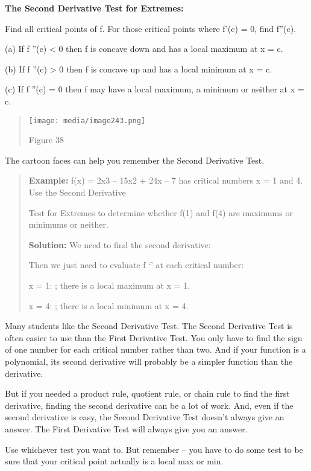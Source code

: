 \textbf{The Second Derivative Test for Extremes:}

Find all critical points of f. For those critical points where f'(c) =
0, find f''(c).

(a) If f ''(c) \textless{} 0 then f is concave down and has a local
maximum at x = c.

(b) If f ''(c) \textgreater{} 0 then f is concave up and has a local
minimum at x = c.

(c) If f ''(c) = 0 then f may have a local maximum, a minimum or neither
at x = c.

\begin{quote}
\texttt{[image: media/image243.png]}

Figure 38
\end{quote}

The cartoon faces can help you remember the Second Derivative Test.

\begin{quote}
\textbf{Example:} f(x) = 2x3 -- 15x2 + 24x -- 7 has critical numbers x =
1 and 4. Use the Second Derivative

Test for Extremes to determine whether f(1) and f(4) are maximums or
minimums or neither.

\textbf{Solution:} We need to find the second derivative:

Then we just need to evaluate f `' at each critical number:

x = 1: ; there is a local maximum at x = 1.

x = 4: ; there is a local minimum at x = 4.
\end{quote}

Many students like the Second Derivative Test. The Second Derivative
Test is often easier to use than the First Derivative Test. You only
have to find the sign of one number for each critical number rather than
two. And if your function is a polynomial, its second derivative will
probably be a simpler function than the derivative.

But if you needed a product rule, quotient rule, or chain rule to find
the first derivative, finding the second derivative can be a lot of
work. And, even if the second derivative is easy, the Second Derivative
Test doesn't always give an answer. The First Derivative Test will
always give you an answer.

Use whichever test you want to. But remember -- you have to do some test
to be sure that your critical point actually is a local max or min.


